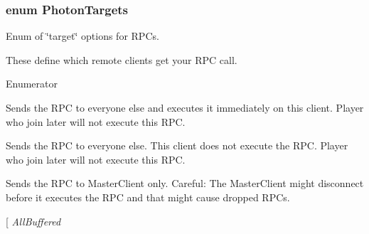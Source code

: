 \subsubsection[{\texorpdfstring{Photon\+Targets}{PhotonTargets}}]{\setlength{\rightskip}{0pt plus 5cm}enum {\bf Photon\+Targets}\hspace{0.3cm}{\ttfamily [strong]}}\hypertarget{group__public_api_gab84b274b6aa3b3a3d7810361da16170f}{}\label{group__public_api_gab84b274b6aa3b3a3d7810361da16170f}


Enum of \char`\"{}target\char`\"{} options for R\+P\+Cs. 

These define which remote clients get your R\+PC call. \begin{Desc}
\item[Enumerator]\par
\begin{description}
\item[{\em 
All\hypertarget{group__public_api_ggab84b274b6aa3b3a3d7810361da16170fab1c94ca2fbc3e78fc30069c8d0f01680}{}\label{group__public_api_ggab84b274b6aa3b3a3d7810361da16170fab1c94ca2fbc3e78fc30069c8d0f01680}
}]Sends the R\+PC to everyone else and executes it immediately on this client. Player who join later will not execute this R\+PC.\item[{\em 
Others\hypertarget{group__public_api_ggab84b274b6aa3b3a3d7810361da16170fa52ef9633d88a7480b3a938ff9eaa2a25}{}\label{group__public_api_ggab84b274b6aa3b3a3d7810361da16170fa52ef9633d88a7480b3a938ff9eaa2a25}
}]Sends the R\+PC to everyone else. This client does not execute the R\+PC. Player who join later will not execute this R\+PC.\item[{\em 
Master\+Client\hypertarget{group__public_api_ggab84b274b6aa3b3a3d7810361da16170fad0209f4a40060d6e7c37d29979d8f444}{}\label{group__public_api_ggab84b274b6aa3b3a3d7810361da16170fad0209f4a40060d6e7c37d29979d8f444}
}]Sends the R\+PC to Master\+Client only. Careful\+: The Master\+Client might disconnect before it executes the R\+PC and that might cause dropped R\+P\+Cs.\item[{\em 
All\+Buffered\hypertarget{group__public_api_ggab84b274b6aa3b3a3d7810361da16170faf1983fc6b424304e28f91977e06f5881}{}\label{group__public_api_ggab84b274b6aa3b3a3d7810361da16170faf1983fc6b424304e28f91977e06f5881}
}
\end{description}
\end{Desc}
